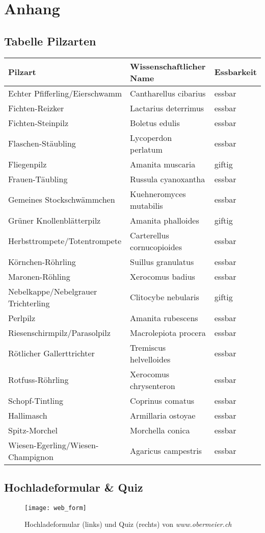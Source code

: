 \section{Anhang}

\subsection{Tabelle Pilzarten} \label{table:shrooms}

\begin{center}
	\begin{tabular}{l | l | l}
		Pilzart & Wissenschaftlicher Name & Essbarkeit\\
		\hline
		Echter Pfifferling/Eierschwamm & Cantharellus cibarius & essbar\\
		Fichten-Reizker & Lactarius deterrimus & essbar\\
		Fichten-Steinpilz & Boletus edulis & essbar\\
		Flaschen-Stäubling & Lycoperdon perlatum & essbar\\
		Fliegenpilz & Amanita muscaria & giftig\\
		Frauen-Täubling & Russula cyanoxantha & essbar\\
		Gemeines Stockschwämmchen & Kuehneromyces mutabilis & essbar\\
		Grüner Knollenblätterpilz & Amanita phalloides & giftig\\
		Herbsttrompete/Totentrompete & Carterellus cornucopioides & essbar\\
		Körnchen-Röhrling & Suillus granulatus & essbar\\
		Maronen-Röhling & Xerocomus badius & essbar\\
		Nebelkappe/Nebelgrauer Trichterling & Clitocybe nebularis & giftig\\
		Perlpilz & Amanita rubescens & essbar\\
		Riesenschirmpilz/Parasolpilz & Macrolepiota procera & essbar\\
		Rötlicher Gallerttrichter & Tremiscus helvelloides & essbar\\
		Rotfuss-Röhrling & Xerocomus chrysenteron & essbar\\
		Schopf-Tintling & Coprinus comatus & essbar\\
		Hallimasch & Armillaria ostoyae & essbar\\
		Spitz-Morchel & Morchella conica & essbar\\
		Wiesen-Egerling/Wiesen-Champignon & Agaricus campestris & essbar\\
	\end{tabular}
\end{center}
\newpage
\subsection{Hochladeformular \& Quiz} \label{img:webpage}

\begin{figure}[h]
	\centering
	\texttt{[image: web\_form]}
	\caption[\textit{\textit{Hochladeformular \& Quiz}}]{Hochladeformular (links) und Quiz (rechts) von \textit{www.obermeier.ch}}
\end{figure}